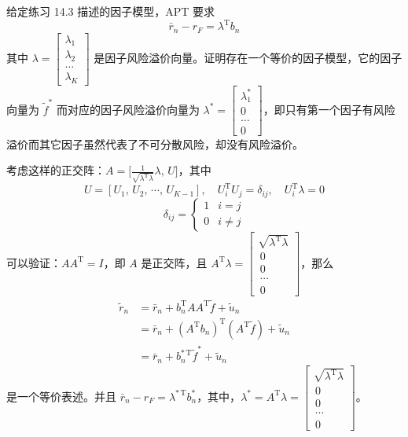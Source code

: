 \begin{problem}
 给定练习 14.3 描述的因子模型，APT 要求
\[
    \bar{r}_{n}-r_{F}=\lambda^{\mathrm{T}}b_{n}
\]
其中 $\lambda=\begin{bmatrix}\lambda_{1} \\ \lambda_{2} \\ \ldots \\ \lambda_{K}\end{bmatrix}$ 是因子风险溢价向量。证明存在一个等价的因子模型，它的因子向量为 $\tilde{f}^{*}$ 而对应的因子风险溢价向量为 $\lambda^{*}=\begin{bmatrix}\lambda_{1}^{*} \\ 0 \\ \ldots \\ 0\end{bmatrix}$，即只有第一个因子有风险溢价而其它因子虽然代表了不可分散风险，却没有风险溢价。
\end{problem}
\begin{solution}
考虑这样的正交阵：$A=\bigl[\frac{1}{\sqrt{\lambda^{\mathrm{T}}\lambda}}\lambda,\,U\bigr]$，其中
\[
    U=[U_{1},\,U_{2},\,\cdots,\,U_{K-1}],\quad U_{i}^{\mathrm{T}}U_{j}=\delta_{ij},\quad U_{i}^{\mathrm{T}}\lambda=0
\]
\[
    \delta_{ij}=\begin{cases}
        1&i=j\\
        0&i\neq j
    \end{cases}
\]
可以验证：$AA^{\mathrm{T}}=I$，即 $A$ 是正交阵，且 $A^{\mathrm{T}}\lambda=\begin{bmatrix}\sqrt{\lambda^{\mathrm{T}}\lambda} \\ \,0 \\ \,0 \\ \,\cdots \\ \,0\end{bmatrix}$，那么
\[
    \begin{aligned}
        \tilde{r}_{n}&=\bar{r}_{n}+b_{n}^{\mathrm{T}}AA^{\mathrm{T}}\tilde{f}+\tilde{u}_{n}\\
        &=\bar{r}_{n}+(A^{\mathrm{T}}b_{n})^{\mathrm{T}}(A^{\mathrm{T}}\tilde{f})+\tilde{u}_{n}\\
        &=\bar{r}_{n}+b_{n}^{*\,\mathrm{T}}\tilde{f}^{*}+\tilde{u}_{n}
    \end{aligned}
\]
是一个等价表述。并且 $\bar{r}_{n}-r_{F}=\lambda^{*\,\mathrm{T}}b_{n}^{*}$，其中，$\lambda^{*}=A^{\mathrm{T}}\lambda=\begin{bmatrix}\sqrt{\lambda^{\mathrm{T}}\lambda} \\ \,0 \\ \,0 \\ \,\cdots \\ \,0\end{bmatrix}$。
\end{solution}

